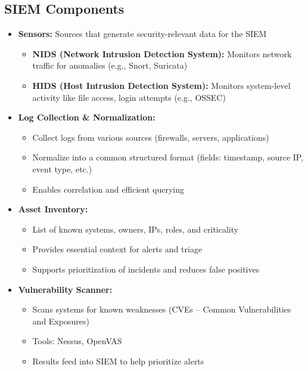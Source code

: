 \subsection{SIEM Components}
{
\begin{itemize}[noitemsep]
  \item \textbf{Sensors:} Sources that generate security-relevant data for the SIEM
    \begin{itemize}[noitemsep]
      \item \textbf{NIDS (Network Intrusion Detection System):} Monitors network traffic for anomalies (e.g., Snort, Suricata)
      \item \textbf{HIDS (Host Intrusion Detection System):} Monitors system-level activity like file access, login attempts (e.g., OSSEC)
    \end{itemize}

  \item \textbf{Log Collection \& Normalization:}
    \begin{itemize}[noitemsep]
      \item Collect logs from various sources (firewalls, servers, applications)
      \item Normalize into a common structured format (fields: timestamp, source IP, event type, etc.)
      \item Enables correlation and efficient querying
    \end{itemize}

  \item \textbf{Asset Inventory:}
    \begin{itemize}[noitemsep]
      \item List of known systems, owners, IPs, roles, and criticality
      \item Provides essential context for alerts and triage
      \item Supports prioritization of incidents and reduces false positives
    \end{itemize}

  \item \textbf{Vulnerability Scanner:}
    \begin{itemize}[noitemsep]
      \item Scans systems for known weaknesses (CVEs – Common Vulnerabilities and Exposures)
      \item Tools: Nessus, OpenVAS
      \item Results feed into SIEM to help prioritize alerts
    \end{itemize}


\end{itemize}}
